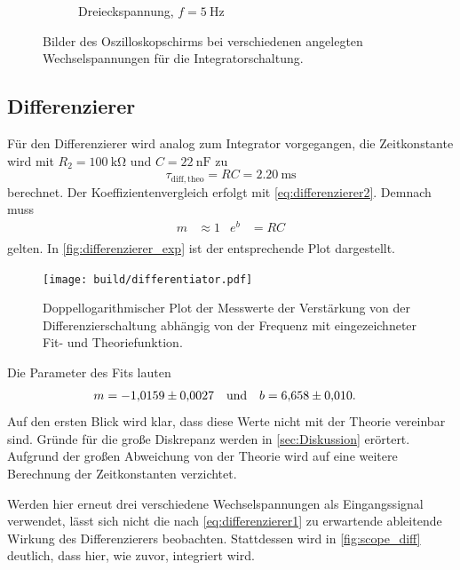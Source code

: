 \begin{figure}
\begin{subfigure}[c]{0.9\textwidth}
    \caption{Dreieckspannung, $f=\qty{5}{\hertz}$}
  \end{subfigure}
  \caption{Bilder des Oszilloskopschirms bei verschiedenen angelegten Wechselspannungen für die Integratorschaltung.}
  \label{fig:scope_int}
\end{figure}

\subsection{Differenzierer}
Für den Differenzierer wird analog zum Integrator vorgegangen, die Zeitkonstante wird mit $R_2=\qty{100}{\kilo\ohm}$ und $C=\qty{22}{\nano\farad}$ zu 
\begin{equation*}
  \tau_{\mathrm{diff, theo}} = RC = \qty{2,20}{\milli\second}
\end{equation*}
berechnet. Der Koeffizientenvergleich erfolgt mit \autoref{eq:differenzierer2}. Demnach muss
\begin{align*}
  m &\approx 1 & e^{b} &={RC} \\
\end{align*}
gelten. In \autoref{fig:differenzierer_exp} ist der entsprechende Plot dargestellt.
\begin{figure}
  \centering
  \texttt{[image: build/differentiator.pdf]}
  \caption{Doppellogarithmischer Plot der Messwerte der Verstärkung von der Differenzierschaltung abhängig von der Frequenz mit eingezeichneter Fit- und Theoriefunktion.}
  \label{fig:differenzierer_exp}
\end{figure}
Die Parameter des Fits lauten
\begin{align*}
  m &= \num{-1.0159+-0.0027} && \text{und}& b&= \num{6.658+-0.010}.
\end{align*}
Auf den ersten Blick wird klar, dass diese Werte nicht mit der Theorie vereinbar sind. Gründe für die große Diskrepanz werden in \autoref{sec:Diskussion} erörtert. Aufgrund der
großen Abweichung von der Theorie wird auf eine weitere Berechnung der Zeitkonstanten verzichtet.

Werden hier erneut drei verschiedene Wechselspannungen als Eingangssignal verwendet, lässt sich nicht die nach \autoref{eq:differenzierer1} zu erwartende ableitende Wirkung des 
Differenzierers beobachten. Stattdessen wird in \autoref{fig:scope_diff} deutlich, dass hier, wie zuvor, integriert wird.

